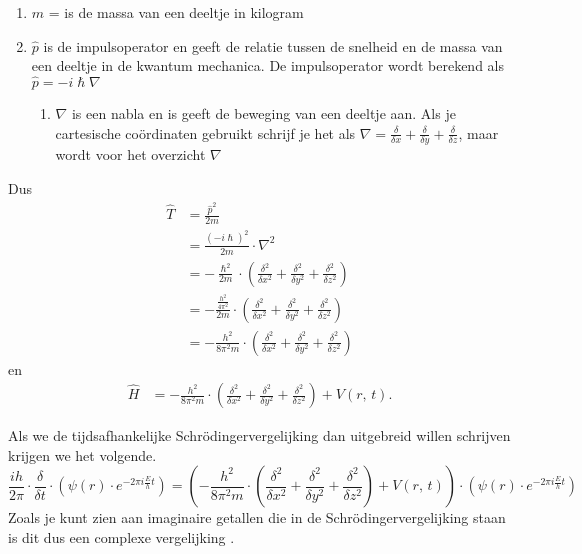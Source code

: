 \documentclass[11pt,fleqn]{book} %
\begin{document}
\begin{enumerate}
\begin{enumerate}
\begin{enumerate}
\item $m$ = is de massa van een deeltje in kilogram
\item $\hat{p}$ is de impulsoperator en geeft de relatie tussen de snelheid en de massa van een deeltje in de kwantum mechanica. De impulsoperator wordt berekend als $\hat{p}=-i\hslash\nabla$
\begin{enumerate}
\item $\nabla$ is een nabla en is geeft de beweging van een deeltje aan. Als je cartesische coördinaten gebruikt schrijf je het als $\nabla = \frac{\delta}{\delta x}+\frac{\delta}{\delta y}+\frac{\delta}{\delta z}$, maar wordt voor het overzicht $\nabla$
\end{enumerate}
\end{enumerate}
\end{enumerate}
\end{enumerate}
Dus
\begin{align*}
\hat{T} &= \frac{\hat{p}^2}{2m}\\
&=\frac{(-i\hslash)^2}{2m}\cdot \nabla^2\\
&=-\frac{\hslash^2}{2m}\cdot \left(\frac{\delta^2}{\delta x^2}+\frac{\delta^2}{\delta y^2}+\frac{\delta^2}{\delta z^2}\right)\\
&= -\frac{\frac{h^2}{4\pi^2}}{2m}\cdot\left(\frac{\delta^2}{\delta x^2}+\frac{\delta^2}{\delta y^2}+\frac{\delta^2}{\delta z^2}\right)\\
&= -\frac{h^2}{8\pi^2m}\cdot\left(\frac{\delta^2}{\delta x^2}+\frac{\delta^2}{\delta y^2}+\frac{\delta^2}{\delta z^2}\right)
\end{align*}
en
\begin{align*}
\hat{H} &=-\frac{h^2}{8\pi^2m}\cdot\left(\frac{\delta^2}{\delta x^2}+\frac{\delta^2}{\delta y^2}+\frac{\delta^2}{\delta z^2}\right)+V(r,\,t).
\end{align*}

Als we de tijdsafhankelijke Schrödingervergelijking dan uitgebreid willen schrijven krijgen we het volgende.
\begin{displaymath}
\frac{ih}{2\pi}\cdot\frac{\delta}{\delta t}\cdot \left(\psi(r)\cdot e^{-2\pi i\frac{E}{h}t}\right) = \left(-\frac{h^2}{8\pi^2m}\cdot\left(\frac{\delta^2}{\delta x^2}+\frac{\delta^2}{\delta y^2}+\frac{\delta^2}{\delta z^2}\right)+V(r,\,t)\right)\cdot\left(\psi(r)\cdot e^{-2\pi i \frac{E}{h}t}\right)
\end{displaymath}
Zoals je kunt zien aan imaginaire getallen die in de Schrödingervergelijking staan is dit dus een complexe vergelijking \cite{schrvgl}\cite{hamop}.
\end{document}
